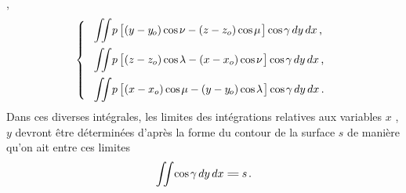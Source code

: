 \documentclass[11pt, twoside, leqno]{article}
\newcommand\equals{\scalebox{1.5}[1]{$=$}}
\newcommand\cosine{\operatorname{cos} \hspace{-0.1ex}}
\begin{document}
\hspace{1ex} ,
\begin{equation}\label{integrales.3}
\left\{\;\begin{array}{l}
\displaystyle\iint \! p \, \bigl[\hspace{.1ex} (y - y_{\hspace{-0.14ex}o}) \cosine \nu - (z - z_o) \cosine \mu \hspace{.2ex}\bigr] \cosine \gamma \, dy \, dx \hspace{.4ex} \text{,}
\\[1em]
\displaystyle\iint \! p \, \bigl[\hspace{.1ex} (z - z_o) \cosine \lambda - (x - x_o) \cosine \nu \hspace{.2ex}\bigr] \cosine \gamma \, dy \, dx \hspace{.4ex} \text{,}
\\[1em]
\displaystyle\iint \! p \, \bigl[\hspace{.1ex} (x - x_o) \cosine \mu - (y - y_{\hspace{-0.14ex}o}) \cosine \lambda \hspace{.2ex}\bigr] \cosine \gamma \, dy \, dx \hspace{.4ex} \text{.}
\end{array}\right.
\end{equation}
Dans ces diverses intégrales, les limites des intégrations relatives aux variables \hspace{1ex}$x$\hspace{-.1ex} , \hspace{.5ex}$y$\hspace{1ex} devront être déterminées d'après la forme du contour de la surface \hspace{1ex}$s$\hspace{1ex} de manière qu'on ait entre ces limites
\begin{equation} %
\displaystyle\iint \! \cosine \gamma \, dy \, dx \hspace{.6ex} \equals \hspace{.5ex} s
\hspace{.3ex} \text{.}
\end{equation}
\end{document}
